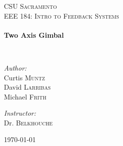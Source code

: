 \begin{titlepage}
\begin{center}


\textsc{\LARGE CSU Sacramento}\\[1.5cm]

\textsc{\Large EEE 184: Intro to Feedback Systems}\\[0.5cm]

\HRule \\[0.4cm]
{ \huge \bfseries Two Axis Gimbal \\[0.4cm] }

\HRule \\[1.5cm]

\begin{minipage}{0.4\textwidth}
\begin{flushleft} \large
\emph{Author:}\\
Curtis \textsc{Muntz}\\
David \textsc{Larribas}\\
Michael \textsc{Frith}
\end{flushleft}
\end{minipage}
\begin{minipage}{0.4\textwidth}
\begin{flushright} \large
\emph{Instructor:} \\
Dr. \textsc{Belkhouche}
\end{flushright}
\end{minipage}

\vfill

{\large \today}

\end{center}
\end{titlepage}